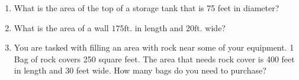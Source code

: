 \begin{enumerate}[1.]
\item What is the area of the top of a storage tank that is 75 feet in diameter?\\

\item  What is the area of a wall $175 \mathrm{ft}$. in length and $20 \mathrm{ft}$. wide?\\

\item  You are tasked with filling an area with rock near some of your equipment. 1 Bag of rock covers 250 square feet. The area that needs rock cover is 400 feet in length and 30 feet wide. How many bags do you need to purchase?\\



\end{enumerate}


